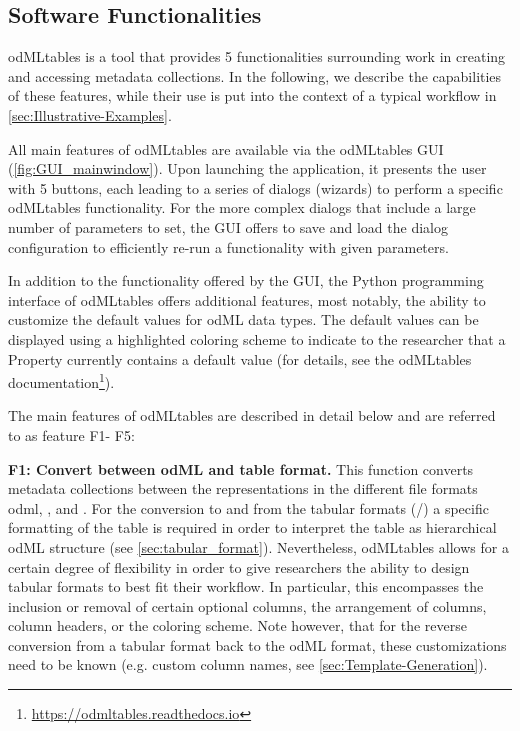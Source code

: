 {\subsection{Software Functionalities}
\label{sec:software_functionalities} 

odMLtables is a tool that provides 5 functionalities surrounding work in creating and accessing metadata collections. In the following, we describe the capabilities of these features, while their use is put into the context of a typical workflow in \cref{sec:Illustrative-Examples}.

All main features of odMLtables are available via the odMLtables GUI (\cref{fig:GUI_mainwindow}). Upon launching the application, it presents the user with 5 buttons, each leading to a series of dialogs (wizards) to perform a specific odMLtables functionality. For the more complex dialogs that include a large number of parameters to set, the GUI offers to save and load the dialog configuration to efficiently re-run a functionality with given parameters. 

In addition to the functionality offered by the GUI, the Python programming interface of odMLtables offers additional features, most notably, the ability to customize the default values for odML data types. The default values can be displayed using a highlighted coloring scheme to indicate to the researcher that a Property currently contains a default value (for details, see the odMLtables documentation\footnote{\url{https://odmltables.readthedocs.io}}).

\def\fconvert{F1}
\def\fgenerate{F2} 
\def\fcompare{F3}
\def\fmerge{F4}
\def\ffilter{F5} 

The main features of odMLtables are described in detail below and are referred to as feature \fconvert - \ffilter:


\textbf{\fconvert: Convert between odML and table format.}
This function converts metadata collections between the representations in the different file formats odml, , and . For the conversion to and from the tabular formats (/) a specific formatting of the table is required in order to interpret the table as hierarchical odML structure (see \cref{sec:tabular_format}). Nevertheless, odMLtables allows for a certain degree of flexibility in order to give researchers the ability to design tabular formats to best fit their workflow. In particular, this encompasses the inclusion or removal of certain optional columns, the arrangement of columns, column headers, or the coloring scheme. Note however, that for the reverse conversion from a tabular format back to the odML format, these customizations need to be known (e.g. custom column names, see \cref{sec:Template-Generation}).

}
